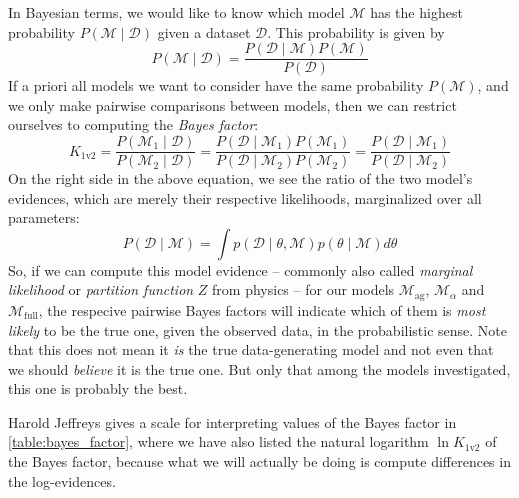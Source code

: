 \documentclass[\relativeRoot/main.tex]{subfiles}
\begin{document}
In Bayesian terms, we would like to know which model $\mathcal{M}$ has the highest probability $P\left( \mathcal{M} \mid \boldsymbol{\mathcal{D}} \right)$ given a dataset $\boldsymbol{\mathcal{D}}$. This probability is given by
%
\begin{equation}
    P\left( \mathcal{M} \mid \boldsymbol{\mathcal{D}} \right) = \frac{P\left( \boldsymbol{\mathcal{D}} \mid \mathcal{M} \right) P\left( \mathcal{M} \right)}{P \left( \boldsymbol{\mathcal{D}} \right)}
\end{equation}
%
If a priori all models we want to consider have the same probability $P \left( \mathcal{M} \right)$, and we only make pairwise comparisons between models, then we can restrict ourselves to computing the \emph{Bayes factor}:
%
\begin{equation}
    K_\text{1v2} = \frac{P\left( \mathcal{M}_1 \mid \boldsymbol{\mathcal{D}} \right)}{P\left( \mathcal{M}_2 \mid \boldsymbol{\mathcal{D}} \right)} = \frac{P\left( \boldsymbol{\mathcal{D}} \mid \mathcal{M}_1 \right) P\left( \mathcal{M}_1 \right)}{P\left( \boldsymbol{\mathcal{D}} \mid \mathcal{M}_2 \right) P\left( \mathcal{M}_2 \right)} = \frac{P\left( \boldsymbol{\mathcal{D}} \mid \mathcal{M}_1 \right)}{P\left( \boldsymbol{\mathcal{D}} \mid \mathcal{M}_2 \right)}
\end{equation}
%
On the right side in the above equation, we see the ratio of the two model's evidences, which are merely their respective likelihoods, marginalized over all parameters:
%
\begin{equation} \label{eq:bayes_factor:evidence}
    P\left( \boldsymbol{\mathcal{D}} \mid \mathcal{M} \right) = \int{ p\left( \boldsymbol{\mathcal{D}} \mid \theta, \mathcal{M} \right) p(\theta \mid \mathcal{M}) d\theta}
\end{equation}
%
So, if we can compute this model evidence -- commonly also called \emph{marginal likelihood} or \emph{partition function} $Z$ from physics -- for our models $\mathcal{M}_\text{ag}$, $\mathcal{M}_\alpha$ and $\mathcal{M}_\text{full}$, the respecive pairwise Bayes factors will indicate which of them is \emph{most likely} to be the true one, given the observed data, in the probabilistic sense. Note that this does not mean it \emph{is} the true data-generating model and not even that we should \emph{believe} it is the true one. But only that among the models investigated, this one is probably the best.

Harold Jeffreys gives a scale for interpreting values of the Bayes factor \cite{jeffreys_theory_1998} in \cref{table:bayes_factor}, where we have also listed the natural logarithm $\ln{K_\text{1v2}}$ of the Bayes factor, because what we will actually be doing is compute differences in the log-evidences.
\end{document}
